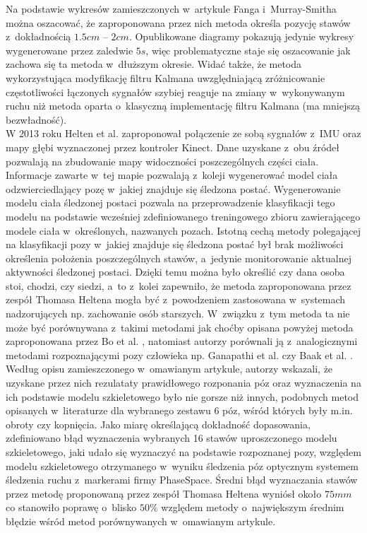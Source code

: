 Na podstawie wykresów zamieszczonych w~artykule Fanga i~Murray-Smitha można oszacować, że zaproponowana przez nich metoda określa pozycję stawów z~dokładnością $1.5 cm$ -- $2 cm$. Opublikowane diagramy pokazują jedynie wykresy wygenerowane przez zaledwie $5s$, więc problematyczne staje się oszacowanie jak zachowa się ta metoda w~dłuższym okresie. Widać także, że metoda wykorzystująca modyfikację filtru Kalmana uwzględniającą zróżnicowanie częstotliwości łączonych sygnałów szybiej reaguje na zmiany w~wykonywanym ruchu niż metoda oparta o~klasyczną implementację filtru Kalmana (ma mniejszą bezwładność).\\
																																																	
W 2013 roku Helten et al. \cite{Helten2013} zaproponował połączenie ze sobą sygnałów z~IMU oraz mapy głębi wyznaczonej przez kontroler Kinect. Dane uzyskane z~obu źródeł pozwalają na zbudowanie mapy widoczności poszczególnych części ciała. Informacje zawarte w~tej mapie pozwalają z~koleji wygenerować model ciała odzwierciedlający pozę w~jakiej znajduje się śledzona postać. Wygenerowanie modelu ciała śledzonej postaci pozwala na przeprowadzenie klasyfikacji tego modelu na podstawie wcześniej zdefiniowanego treningowego zbioru zawierającego modele ciała w~określonych, nazwanych pozach. Istotną cechą metody polegającej na klasyfikacji pozy w~jakiej znajduje się śledzona postać był brak możliwości określenia położenia poszczególnych stawów, a~jedynie monitorowanie aktualnej aktywności śledzonej postaci. Dzięki temu można było określić czy dana osoba stoi, chodzi, czy siedzi, a~to z~kolei zapewniło, że metoda zaproponowana przez zespół Thomasa Heltena mogła być z~powodzeniem zastosowana w~systemach nadzorujących np. zachowanie osób starszych. W~związku z~tym metoda ta nie może być porównywana z~takimi metodami jak choćby opisana powyżej metoda zaproponowana przez Bo et al. \cite{Bo2011a}, natomiast autorzy porównali ją z~analogicznymi metodami rozpoznającymi pozy człowieka np. Ganapathi et al. \cite{Ganapathi2010} czy Baak et al. \cite{Baak2011}. Według opisu zamieszczonego w~omawianym artykule, autorzy wskazali, że uzyskane przez nich rezulataty prawidłowego rozponania póz oraz wyznaczenia na ich podstawie modelu szkieletowego było nie gorsze niż innych, podobnych metod opisanych w~literaturze dla wybranego zestawu 6 póz, wśród których były m.in. obroty czy kopnięcia. Jako miarę określającą dokładność dopasowania, zdefiniowano błąd wyznaczenia wybranych 16 stawów uproszczonego modelu szkieletowego, jaki udało się wyznaczyć na podstawie rozpoznanej pozy, względem modelu szkieletowego otrzymanego w~wyniku śledzenia póz optycznym systemem śledzenia ruchu z~markerami firmy PhaseSpace. Średni błąd wyznaczania stawów przez metodę proponowaną przez zespół Thomasa Heltena wyniósł około $75mm$ co stanowiło poprawę o~blisko $50\%$ względem metody o~największym średnim błędzie wśród metod porównywanych w~omawianym artykule.\\
																																																			
